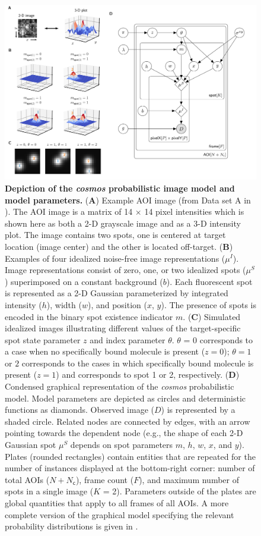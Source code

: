 \begin{figure}
\begin{fullwidth}
\includegraphics[width=183mm]{figures/graphical_model.png}
\caption{\textbf{Depiction of the \emph{cosmos} probabilistic image model and model parameters.} (\textbf{A}) Example AOI image (from Data set A in ). The AOI image is a matrix of 14 $\times$ 14 pixel intensities which is shown here as both a 2-D grayscale image and as a 3-D intensity plot. The image contains two spots, one is centered at target location (image center) and the other is located off-target. (\textbf{B}) Examples of four idealized noise-free image representations ($\mu^I$). Image representations consist of zero, one, or two idealized spots ($\mu^S$) superimposed on a constant background ($b$). Each fluorescent spot is represented as a 2-D Gaussian parameterized by integrated intensity ($h$), width ($w$), and position ($x$, $y$). The presence of spots is encoded in the binary spot existence indicator $m$. (\textbf{C}) Simulated idealized images illustrating different values of the target-specific spot state parameter $z$ and index parameter $\theta$. $\theta$ = 0 corresponds to a case when no specifically bound molecule is present ($z = 0$); $\theta = 1$ or $2$ corresponds to the cases in which specifically bound molecule is present ($z = 1$) and corresponds to spot 1 or 2, respectively. (\textbf{D}) Condensed graphical representation of the \emph{cosmos} probabilistic model. Model parameters are depicted as circles and deterministic functions as diamonds. Observed image ($D$) is represented by a shaded circle. Related nodes are connected by edges, with an arrow pointing towards the dependent node (e.g., the shape of each 2-D Gaussian spot $\mu^S$ depends on spot parameters $m$, $h$, $w$, $x$, and $y$). Plates (rounded rectangles) contain entities that are repeated for the number of instances displayed at the bottom-right corner: number of total AOIs ($N+N_\mathsf{c}$), frame count ($F$), and maximum number of spots in a single image ($K$ = 2). Parameters outside of the plates are global quantities that apply to all frames of all AOIs. A more complete version of the graphical model specifying the relevant probability distributions is given in . }
\label{fig:graphical_model}


\end{fullwidth}
\end{figure}
